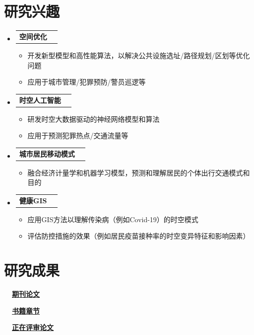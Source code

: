 \documentclass[A4,11pt]{article}
\makeatletter
\newcommand{\CVItem}[1]{
  \item\small{
    {#1 \vspace{-2pt}}
  }
}
\newcommand{\CVSubheading}[4]{
  \vspace{-2pt}\item
    \begin{tabular*}{0.97\textwidth}[t]{l@{\extracolsep{\fill}}r}
      \textbf{#1} & #2 \\
      \small#3 & \small #4 \\
    \end{tabular*}\vspace{-7pt}
}
\newcommand{\CVSubheadingSimple}[2]{
  \vspace{-2pt}\item
    \begin{tabular*}{0.97\textwidth}[t]{l@{\extracolsep{\fill}}r}
      \textbf{#1} & #2 \\
    \end{tabular*}\vspace{-7pt}
}
\newcommand{\CVSubHeadingListStart}{\begin{itemize}[leftmargin=0.5cm, label={}]}
\newcommand{\CVSubHeadingListEnd}{\end{itemize}}
\newcommand{\CVItemListStart}{\begin{itemize}}
\newcommand{\CVItemListEnd}{\end{itemize}\vspace{-5pt}}
\makeatother
\begin{document}
\begin{CJK*}{UTF8}{gbsn}
\section{研究兴趣}
  \CVSubHeadingListStart
    \CVSubheadingSimple
      {空间优化}{}
      \CVItemListStart
        \CVItem{开发新型模型和高性能算法，以解决公共设施选址/路径规划/区划等优化问题}        
        \CVItem{应用于城市管理/犯罪预防/警员巡逻等}
      \CVItemListEnd
     \CVSubheadingSimple
      {时空人工智能}{}
      \CVItemListStart
        \CVItem{研发时空大数据驱动的神经网络模型和算法}        
        \CVItem{应用于预测犯罪热点/交通流量等}
      \CVItemListEnd
     \CVSubheadingSimple
      {城市居民移动模式}{}
      \CVItemListStart
        \CVItem{融合经济计量学和机器学习模型，预测和理解居民的个体出行交通模式和目的}        
      \CVItemListEnd
     \CVSubheadingSimple
      {健康GIS}{}
      \CVItemListStart
        \CVItem{应用GIS方法以理解传染病（例如Covid-19）的时空模式}
        \CVItem{评估防控措施的效果（例如居民疫苗接种率的时空变异特征和影响因素）}
      \CVItemListEnd
  \CVSubHeadingListEnd

\section{研究成果}

\vspace{2mm}
\noindent \textbf{\ \ \underline{期刊论文}}
\begin{bibunit}
\nocite{apsrev42Control}
\nocite{Chen2021, Chen2019ijgis, Chen2018ijgis, Chen2017CEUS, Aslam2021, Ren2020ijgis, Zhang2021cities, Qiao2011langmuir, Qiao2011jpcc, Qiao2010jpcb}
\putbib[publications]
\end{bibunit}

\vspace{2mm}
\noindent \textbf{\ \ \underline{书籍章节}}
\begin{bibunit}
\nocite{apsrev42Control}
\nocite{Chen2021chapter}
\putbib[publications]
\end{bibunit}

\vspace{2mm}
\noindent \textbf{\ \ \underline{正在评审论文}}
\begin{bibunit}
\nocite{apsrev42Control}
\nocite{Huanfa2021trans, Huanfa2022IEEEITS, Huanfa2022AAAG, Huanfa2022EPB, Yutong2022TBS, Bei2022GSIS, Hongbiao2022AE}
\putbib[publications]
\end{bibunit}


\end{CJK*}
\end{document}
